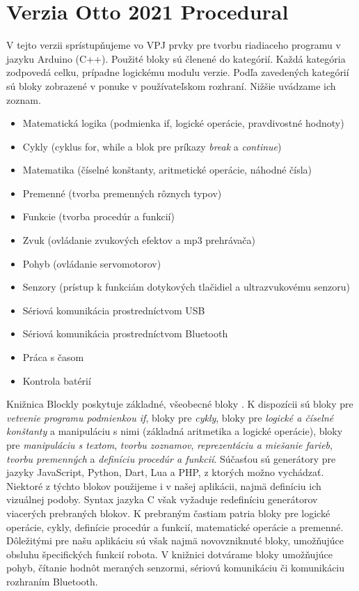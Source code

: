 \section{Verzia Otto 2021 Procedural}
V tejto verzii sprístupňujeme vo VPJ prvky pre tvorbu riadiaceho programu v jazyku Arduino (C++). Použité bloky sú členené do kategórií. Každá kategória zodpovedá  celku, prípadne logickému modulu verzie. Podľa zavedených kategórií sú bloky zobrazené v ponuke v používateľskom rozhraní. Nižšie uvádzame ich zoznam.

\begin{itemize}[topsep=8pt,itemsep=0.1pt,partopsep=4pt, parsep=4pt]
\item Matematická logika (podmienka if, logické operácie, pravdivostné hodnoty)
\item Cykly (cyklus for, while a blok pre príkazy \textit{break} a \textit{continue})
\item Matematika (číselné konštanty, aritmetické operácie, náhodné čísla)
\item Premenné (tvorba premenných rôznych typov)
\item Funkcie (tvorba procedúr a funkcií)
\item Zvuk (ovládanie zvukových efektov a mp3 prehrávača)
\item Pohyb (ovládanie servomotorov)
\item Senzory (prístup k funkciám dotykových tlačidiel a ultrazvukovému senzoru)
\item Sériová komunikácia prostredníctvom USB
\item Sériová komunikácia prostredníctvom Bluetooth
\item Práca s časom
\item Kontrola batérií
\end{itemize}

Knižnica Blockly poskytuje základné, všeobecné bloky . K dispozícii sú bloky pre \textit{vetvenie programu podmienkou if}, bloky pre \textit{cykly}, bloky pre \textit{logické a číselné konštanty} a manipuláciu s nimi (základná aritmetika a logické operácie), bloky pre \textit{manipuláciu s textom}, \textit{tvorbu zoznamov}, \textit{reprezentáciu a miešanie farieb}, \textit{tvorbu premenných} a \textit{definíciu procedúr a funkcií}. Súčasťou sú generátory pre jazyky JavaScript, Python, Dart, Lua a PHP, z ktorých možno vychádzať. Niektoré z týchto blokov použijeme i v našej aplikácii, najmä definíciu ich vizuálnej podoby. Syntax jazyka C však vyžaduje redefiníciu generátorov viacerých prebraných blokov. K prebraným častiam patria bloky pre logické operácie, cykly, definície procedúr a funkcií, matematické operácie a premenné. Dôležitými pre našu aplikáciu sú však najmä novovzniknuté bloky, umožňujúce obsluhu špecifických funkcií robota. V knižnici dotvárame bloky umožňujúce pohyb, čítanie hodnôt meraných senzormi, sériovú komunikáciu či komunikáciu rozhraním Bluetooth. 

